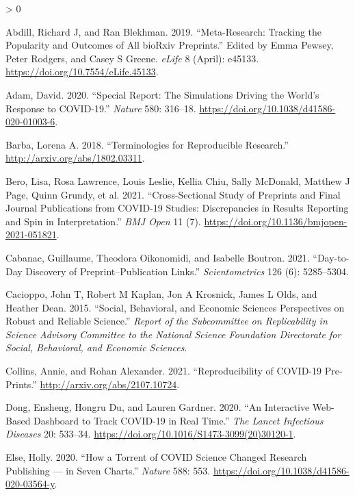 \documentclass[
]{article}
\newlength{\cslhangindent}
\newenvironment{CSLReferences}[2] %
 {%
  \setlength{\parindent}{0pt}
  \ifodd #1 \everypar{\setlength{\hangindent}{\cslhangindent}}\ignorespaces\fi
  \ifnum #2 > 0
  \setlength{\parskip}{#2\baselineskip}
  \fi
 }%
 {}
\begin{document}
\hypertarget{refs}{}
\begin{CSLReferences}{1}{0}
\leavevmode\hypertarget{ref-abdill2019}{}%
Abdill, Richard J, and Ran Blekhman. 2019. {``Meta-Research: Tracking the Popularity and Outcomes of All bioRxiv Preprints.''} Edited by Emma Pewsey, Peter Rodgers, and Casey S Greene. \emph{eLife} 8 (April): e45133. \url{https://doi.org/10.7554/eLife.45133}.

\leavevmode\hypertarget{ref-adam2020}{}%
Adam, David. 2020. {``Special Report: The Simulations Driving the World's Response to COVID-19.''} \emph{Nature} 580: 316--18. \url{https://doi.org/10.1038/d41586-020-01003-6}.

\leavevmode\hypertarget{ref-barba2018terminologies}{}%
Barba, Lorena A. 2018. {``Terminologies for Reproducible Research.''} \url{http://arxiv.org/abs/1802.03311}.

\leavevmode\hypertarget{ref-Beroe051821}{}%
Bero, Lisa, Rosa Lawrence, Louis Leslie, Kellia Chiu, Sally McDonald, Matthew J Page, Quinn Grundy, et al. 2021. {``Cross-Sectional Study of Preprints and Final Journal Publications from COVID-19 Studies: Discrepancies in Results Reporting and Spin in Interpretation.''} \emph{BMJ Open} 11 (7). \url{https://doi.org/10.1136/bmjopen-2021-051821}.

\leavevmode\hypertarget{ref-cabanac2021day}{}%
Cabanac, Guillaume, Theodora Oikonomidi, and Isabelle Boutron. 2021. {``Day-to-Day Discovery of Preprint--Publication Links.''} \emph{Scientometrics} 126 (6): 5285--5304.

\leavevmode\hypertarget{ref-cacioppo2015social}{}%
Cacioppo, John T, Robert M Kaplan, Jon A Krosnick, James L Olds, and Heather Dean. 2015. {``Social, Behavioral, and Economic Sciences Perspectives on Robust and Reliable Science.''} \emph{Report of the Subcommittee on Replicability in Science Advisory Committee to the National Science Foundation Directorate for Social, Behavioral, and Economic Sciences}.

\leavevmode\hypertarget{ref-collins2021reproducibility}{}%
Collins, Annie, and Rohan Alexander. 2021. {``Reproducibility of COVID-19 Pre-Prints.''} \url{http://arxiv.org/abs/2107.10724}.

\leavevmode\hypertarget{ref-citeCSSE}{}%
Dong, Ensheng, Hongru Du, and Lauren Gardner. 2020. {``An Interactive Web-Based Dashboard to Track COVID-19 in Real Time.''} \emph{The Lancet Infectious Diseases} 20: 533--34. \url{https://doi.org/10.1016/S1473-3099(20)30120-1}.

\leavevmode\hypertarget{ref-else2020}{}%
Else, Holly. 2020. {``How a Torrent of COVID Science Changed Research Publishing --- in Seven Charts.''} \emph{Nature} 588: 553. \url{https://doi.org/10.1038/d41586-020-03564-y}.


\end{CSLReferences}
\end{document}
